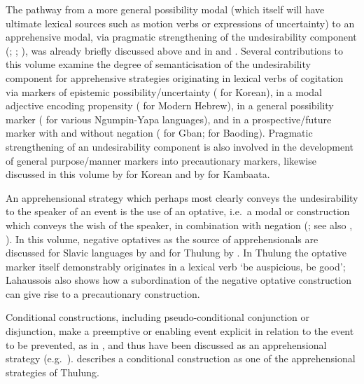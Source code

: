 \documentclass[output=paper,colorlinks,citecolor=brown
]{langscibook}
\begin{document}
The pathway from a more general possibility modal (which itself will have ultimate lexical sources such as motion verbs or expressions of uncertainty) to an apprehensive modal, via pragmatic strengthening of the undesirability component (\cite[211]{bybeeetal1994}; \cite[34--36]{Dobrushina2006}; \cite{pakendorfschalley2007}), was already briefly discussed above and in  and . Several contributions to this volume examine the degree of semanticisation of the undesirability component for apprehensive strategies originating in lexical verbs of cogitation via markers of epistemic possibility\slash uncertainty (\citeauthor{chapters/rhee-kuteva} for Korean), in a modal adjective encoding propensity (\citeauthor{chapters/francez} for Modern Hebrew), in a general possibility marker (\citeauthor{chapters/browne} for various Ngumpin\hyp Yapa languages), and in a prospective\slash future marker with and without negation (\citeauthor{chapters/fedotov} for Gban; \citeauthor{chapters/song} for Baoding). Pragmatic strengthening of an undesirability component is also involved in the development of general purpose/manner markers into precautionary markers, likewise discussed in this volume by \citeauthor{chapters/rhee-kuteva} for Korean and by \citeauthor{chapters/treis} for Kambaata.


An apprehensional strategy which perhaps most clearly conveys the undesirability to the speaker of an event is the use of an optative, i.e.\ a modal or construction which conveys the wish of the speaker, in combination with negation (\cite{Dobrushina2006}; see also , ). In this volume, negative optatives  as the source of apprehensionals are discussed for Slavic languages by \citeauthor{chapters/wiemer} and for Thulung by \citeauthor{chapters/lahaussois}. In Thulung the optative marker itself demonstrably originates in a lexical verb `be auspicious, be good'; Lahaussois also shows how a subordination of the negative optative construction can give rise to a precautionary construction.

\largerpage
Conditional constructions, including pseudo-conditional conjunction or disjunction, make a preemptive or enabling event explicit in relation to the event to be prevented, as in , and thus have been discussed as an apprehensional strategy (e.g.\ \cites{auwera1986}{dominicyfranken2002}[35--40]{narrog2012}{clancyetal1997}{knoob2008}). \citet{chapters/lahaussois}  describes a conditional construction as one of the apprehensional strategies of Thulung. 
\end{document}

